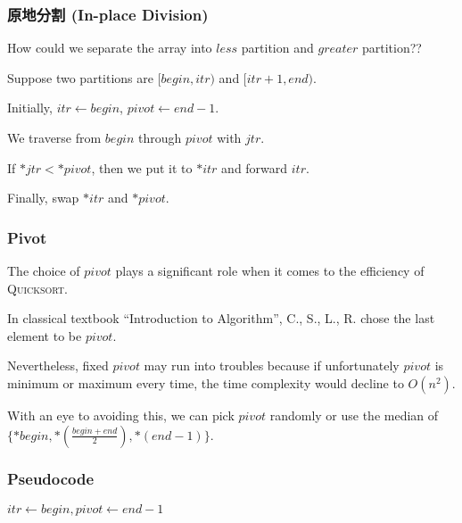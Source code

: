 \documentclass{beamer}
\begin{document}
\frame
{
	\frametitle{原地分割 (In-place Division)}
	
	How could we separate the array into $less$ partition and $greater$ partition??\pause
	
	Suppose two partitions are $[begin, itr)$ and $[itr + 1, end)$.\pause
	
	Initially, $itr\gets begin$, $pivot\gets end-1$.\pause
	
	We traverse from $begin$ through $pivot$ with $jtr$.\pause
	
	If $*jtr < *pivot$, then we put it to $*itr$ and forward $itr$.\pause
	
	Finally, swap $*itr$ and $*pivot$.
}

\frame
{
	\frametitle{Pivot}
	
	The choice of $pivot$ plays a significant role when it comes to the efficiency of \textsc{Quicksort}.\pause
	
	In classical textbook ``Introduction to Algorithm'', C., S., L., R. chose the last element to be $pivot$.\pause
	
	Nevertheless, fixed $pivot$ may run into troubles because if unfortunately $pivot$ is minimum or maximum every time, the time complexity would decline to $O(n^2)$.\pause
	
	With an eye to avoiding this, we can pick $pivot$ randomly or use the median of $\{*begin, *(\frac{begin+end}{2}), *(end-1)\}$.
}

\frame
{
	\frametitle{Pseudocode}
	
	\begin{algorithmic}
			\pause
				\State\Return
			\EndIf
			\pause
            \State$itr\gets begin, pivot\gets end-1$
                    \State{}
                \EndIf
            \EndFor
            \State{}
            \pause
            \State{}
            \State{}
            \pause
            \State{}
        \EndProcedure
	\end{algorithmic}
}
\end{document}
